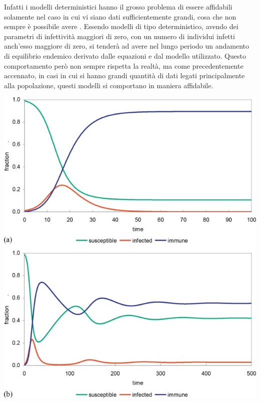 Infatti i modelli deterministici hanno il grosso problema di
essere affidabili solamente nel caso in cui vi siano dati 
sufficientemente grandi, cosa che non sempre è possibile
avere \cite{wiki:Compartmental_models_in_epidemiology}.
Essendo modelli di tipo deterministico, avendo dei parametri 
di infettività maggiori di zero, con un numero di individui infetti
anch'esso maggiore di zero, si tenderà ad avere nel lungo
periodo un andamento di equilibrio endemico derivato 
dalle equazioni e dal modello utilizzato. Questo comportamento
però non sempre rispetta la realtà, ma come precedentemente 
accennato, in casi in cui si hanno grandi quantità di dati 
legati principalmente alla popolazione, questi modelli si 
comportano in maniera affidabile.

\begin{minipage}{\linewidth}
    \centering
    \includegraphics[width=\textwidth]{img/3-s2.0-B9780128012383988378-f98837-02-9780128012383.jpg}
    \label{fig:Endemic_equilibrium}
\end{minipage}

